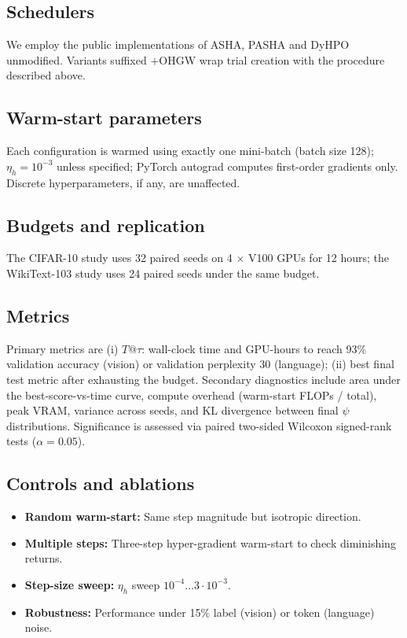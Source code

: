 \documentclass{article} %
\begin{document}
\subsection{Schedulers}
We employ the public implementations of ASHA, PASHA and DyHPO \cite{bohdal-2022-pasha,wistuba-2022-supervising} unmodified. Variants suffixed \(+\)OHGW wrap trial creation with the procedure described above.

\subsection{Warm-start parameters}
Each configuration is warmed using exactly one mini-batch (batch size 128); \(\eta_h = 10^{-3}\) unless specified; PyTorch autograd computes first-order gradients only. Discrete hyperparameters, if any, are unaffected.

\subsection{Budgets and replication}
The CIFAR-10 study uses 32 paired seeds on 4 \(\times\) V100 GPUs for 12 hours; the WikiText-103 study uses 24 paired seeds under the same budget.

\subsection{Metrics}
Primary metrics are (i) \(T@\tau\): wall-clock time and GPU-hours to reach 93\% validation accuracy (vision) or validation perplexity 30 (language); (ii) best final test metric after exhausting the budget. Secondary diagnostics include area under the best-score-vs-time curve, compute overhead (warm-start FLOPs / total), peak VRAM, variance across seeds, and KL divergence between final \(\psi\) distributions. Significance is assessed via paired two-sided Wilcoxon signed-rank tests (\(\alpha = 0.05\)).

\subsection{Controls and ablations}
\begin{itemize}
  \item \textbf{Random warm-start:} Same step magnitude but isotropic direction.
  \item \textbf{Multiple steps:} Three-step hyper-gradient warm-start to check diminishing returns.
  \item \textbf{Step-size sweep:} \(\eta_h\) sweep \(10^{-4} \ldots 3\cdot10^{-3}\).
  \item \textbf{Robustness:} Performance under 15\% label (vision) or token (language) noise.
\end{itemize}
\end{document}
